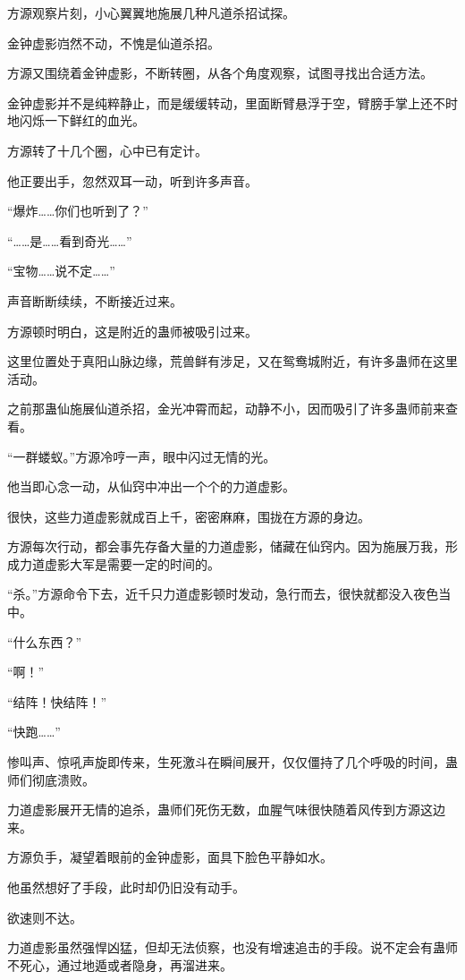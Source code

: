 \begin{this_body}
方源观察片刻，小心翼翼地施展几种凡道杀招试探。

金钟虚影岿然不动，不愧是仙道杀招。

方源又围绕着金钟虚影，不断转圈，从各个角度观察，试图寻找出合适方法。

金钟虚影并不是纯粹静止，而是缓缓转动，里面断臂悬浮于空，臂膀手掌上还不时地闪烁一下鲜红的血光。

方源转了十几个圈，心中已有定计。

他正要出手，忽然双耳一动，听到许多声音。

“爆炸……你们也听到了？”

“……是……看到奇光……”

“宝物……说不定……”

声音断断续续，不断接近过来。

方源顿时明白，这是附近的蛊师被吸引过来。

这里位置处于真阳山脉边缘，荒兽鲜有涉足，又在鸳鸯城附近，有许多蛊师在这里活动。

之前那蛊仙施展仙道杀招，金光冲霄而起，动静不小，因而吸引了许多蛊师前来查看。

“一群蝼蚁。”方源冷哼一声，眼中闪过无情的光。

他当即心念一动，从仙窍中冲出一个个的力道虚影。

很快，这些力道虚影就成百上千，密密麻麻，围拢在方源的身边。

方源每次行动，都会事先存备大量的力道虚影，储藏在仙窍内。因为施展万我，形成力道虚影大军是需要一定的时间的。

“杀。”方源命令下去，近千只力道虚影顿时发动，急行而去，很快就都没入夜色当中。

“什么东西？”

“啊！”

“结阵！快结阵！”

“快跑……”

惨叫声、惊吼声旋即传来，生死激斗在瞬间展开，仅仅僵持了几个呼吸的时间，蛊师们彻底溃败。

力道虚影展开无情的追杀，蛊师们死伤无数，血腥气味很快随着风传到方源这边来。

方源负手，凝望着眼前的金钟虚影，面具下脸色平静如水。

他虽然想好了手段，此时却仍旧没有动手。

欲速则不达。

力道虚影虽然强悍凶猛，但却无法侦察，也没有增速追击的手段。说不定会有蛊师不死心，通过地遁或者隐身，再溜进来。


\end{this_body}
